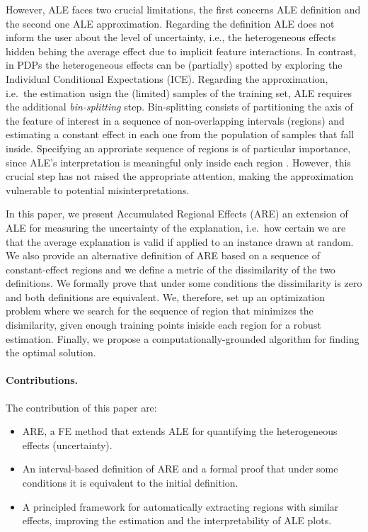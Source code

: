 \documentclass[twoside]{article}
\begin{document}
However, ALE faces two crucial limitations, the first concerns ALE
definition and the second one ALE approximation. Regarding the
definition ALE does not inform the user about the level of
uncertainty, i.e., the heterogeneous effects hidden behing the average
effect due to implicit feature interactions. In contrast, in PDPs the
heterogeneous effects can be (partially) spotted by exploring the
Individual Conditional Expectations
(ICE)\citep{goldstein2015peeking}. Regarding the approximation,
i.e.~the estimation usign the (limited) samples of the training set,
ALE requires the additional \textit{bin-splitting} step. Bin-splitting
consists of partitioning the axis of the feature of interest in a
sequence of non-overlapping intervals (regions) and estimating a
constant effect in each one from the population of samples that fall
inside. Specifying an approriate sequence of regions is of particular
importance, since ALE's interpretation is meaningful only inside each
region \citep{molnar2022}. However, this crucial step has not raised
the appropriate attention, making the approximation vulnerable to
potential misinterpretations.

In this paper, we present Accumulated Regional Effects (ARE) an
extension of ALE for measuring the uncertainty of the explanation,
i.e.~how certain we are that the average explanation is valid if
applied to an instance drawn at random. We also provide an alternative
definition of ARE based on a sequence of constant-effect regions and
we define a metric of the dissimilarity of the two definitions. We
formally prove that under some conditions the dissimilarity is zero
and both definitions are equivalent. We, therefore, set up an
optimization problem where we search for the sequence of region that
minimizes the disimilarity, given enough training points iniside each
region for a robust estimation. Finally, we propose a
computationally-grounded algorithm for finding the optimal solution.

\paragraph{Contributions.} The contribution of this paper are: 

\begin{itemize}
\item ARE, a FE method that extends ALE for quantifying the
  heterogeneous effects (uncertainty).
\item An interval-based definition of ARE and a formal proof that
  under some conditions it is equivalent to the initial definition.
\item A principled framework for automatically extracting regions with
  similar effects, improving the estimation and the interpretability
  of ALE plots.
\end{itemize}
\end{document}
